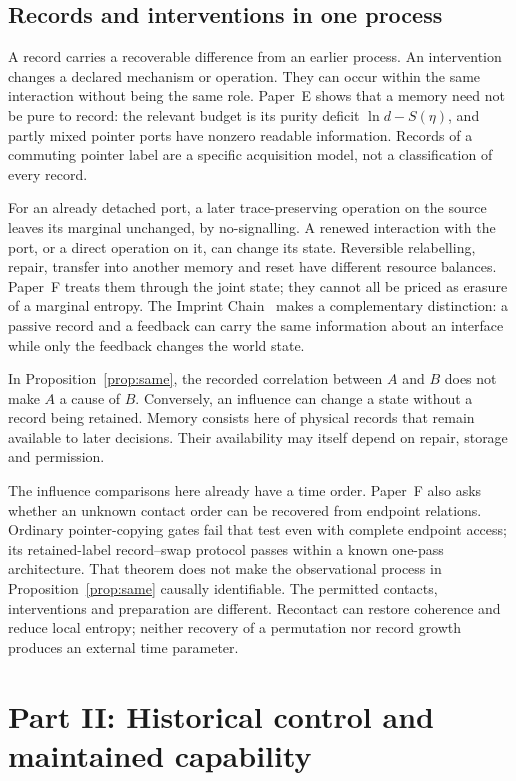 \documentclass[11pt,a4paper]{article}
\begin{document}
\subsection{Records and interventions in one process}

A record carries a recoverable difference from an earlier process.
An intervention changes a declared mechanism or operation. They can occur
within the same interaction without being the same role.
Paper~E shows that a memory need not be pure to record: the relevant budget
is its purity deficit \(\ln d-S(\eta)\), and partly mixed pointer ports have
nonzero readable information. Records of a commuting pointer label are a
specific acquisition model, not a classification of every record.

For an already detached port, a later trace-preserving operation on the
source leaves its marginal unchanged, by no-signalling. A renewed
interaction with the port, or a direct operation on it, can change its
state. Reversible relabelling, repair, transfer into another memory and
reset have different resource balances. Paper~F treats them through the
joint state; they cannot all be priced as erasure of a marginal entropy.
The Imprint Chain~\cite{LiuImprintChain} makes a complementary distinction:
a passive record and a feedback can carry the same information about an
interface while only the feedback changes the world state.

In Proposition~\ref{prop:same}, the recorded correlation between \(A\) and
\(B\) does not make \(A\) a cause of \(B\). Conversely, an influence can
change a state without a record being retained. Memory consists here of
physical records that remain available to later decisions. Their
availability may itself depend on repair, storage and permission.

The influence comparisons here already have a time order. Paper~F
also asks whether an unknown contact order can be recovered from
endpoint relations. Ordinary pointer-copying gates fail that test even
with complete endpoint access; its retained-label record--swap protocol
passes within a known one-pass architecture. That theorem does not make
the observational process in Proposition~\ref{prop:same} causally
identifiable. The permitted contacts, interventions and preparation are
different. Recontact can restore coherence and reduce local entropy;
neither recovery of a permutation nor record growth produces an external
time parameter.

\section{Part II: Historical control and maintained capability}
\label{sec:agency}
\end{document}
